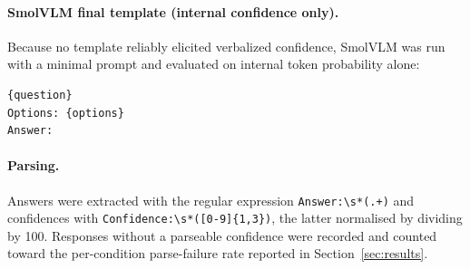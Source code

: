 \documentclass[11pt]{article}
\begin{document}
\paragraph{SmolVLM final template (internal confidence only).} Because no
template reliably elicited verbalized confidence, SmolVLM was run with a
minimal prompt and evaluated on internal token probability alone:

\begin{verbatim}
{question}
Options: {options}
Answer:
\end{verbatim}

\paragraph{Parsing.} Answers were extracted with the regular expression
\texttt{Answer:\textbackslash s*(.+)} and confidences with
\texttt{Confidence:\textbackslash s*([0-9]\{1,3\})}, the latter normalised by
dividing by 100. Responses without a parseable confidence were recorded and
counted toward the per-condition parse-failure rate reported in
Section~\ref{sec:results}.
\end{document}
